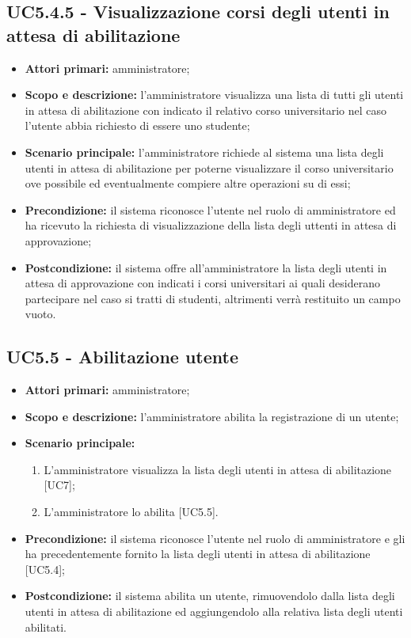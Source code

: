 \documentclass[AnalisiDeiRequisiti.tex]{subfiles}
\begin{document}
\subsection{UC5.4.5 - Visualizzazione corsi degli utenti in attesa di abilitazione}
\begin{itemize}
	\item \textbf{Attori primari:} amministratore;
	\item \textbf{Scopo e descrizione:} l'amministratore visualizza una lista di tutti gli utenti in attesa di abilitazione con indicato il relativo corso universitario nel caso l'utente abbia richiesto di essere uno studente;
	\item \textbf{Scenario principale:} l'amministratore richiede al sistema una lista degli utenti in attesa di abilitazione per poterne visualizzare il corso universitario ove possibile ed eventualmente compiere altre operazioni su di essi;
	\item \textbf{Precondizione:} il sistema riconosce l'utente nel ruolo di amministratore ed ha ricevuto la richiesta di visualizzazione della lista degli uttenti in attesa di approvazione;
	\item \textbf{Postcondizione:} il sistema offre all'amministratore la lista degli utenti in attesa di approvazione con indicati i corsi universitari ai quali desiderano partecipare nel caso si tratti di studenti, altrimenti verrà restituito un campo vuoto.
\end{itemize}
\subsection{UC5.5 - Abilitazione utente}
\begin{itemize}
	\item \textbf{Attori primari:} amministratore;
	\item \textbf{Scopo e descrizione:} l'amministratore abilita la registrazione di un utente;
	\item \textbf{Scenario principale:}
	\begin{enumerate}
		\item L'amministratore visualizza la lista degli utenti in attesa di abilitazione [UC7];
		\item L'amministratore lo abilita [UC5.5].
	\end{enumerate}
	\item \textbf{Precondizione:} il sistema riconosce l'utente nel ruolo di amministratore e gli ha precedentemente fornito la lista degli utenti in attesa di abilitazione [UC5.4];
	\item \textbf{Postcondizione:} il sistema abilita un utente, rimuovendolo dalla lista degli utenti in attesa di abilitazione ed aggiungendolo alla relativa lista degli utenti abilitati.
\end{itemize}
\end{document}
